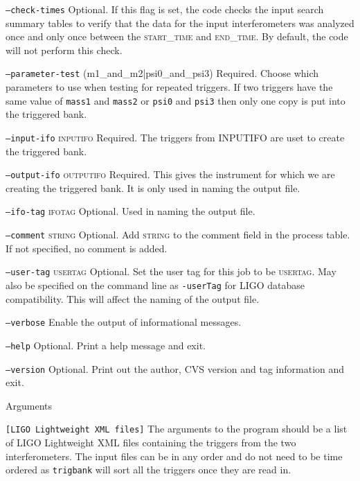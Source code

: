 \begin{entry}
\begin{entry}
\item[\texttt{--check-times}] Optional.  If this flag is set, the code checks
the input search summary tables to verify that the data for the input
interferometers was analyzed once and only once between the
\textsc{start\_time} and \textsc{end\_time}.  By default, the code will not
perform this check.

\item[\texttt{--parameter-test} (m1\_and\_m2|psi0\_and\_psi3)] Required. Choose
which parameters to use when testing for repeated triggers.  If two triggers
have the same value of \texttt{mass1} and \texttt{mass2} or \texttt{psi0} and
\texttt{psi3} then only one copy is put into the triggered bank.

\item[\texttt{--input-ifo} \textsc{inputifo}] Required. The triggers from
\textsc{INPUTIFO} are uset to create the triggered bank.

\item[\texttt{--output-ifo} \textsc{outputifo}] Required. This gives the
instrument for which we are creating the triggered bank.  It is only used in
naming the output file.

\item[\texttt{--ifo-tag} \textsc{ifotag}] Optional.  Used in naming the output
file.

\item[\texttt{--comment} \textsc{string}] Optional. Add \textsc{string}
to the comment field in the process table. If not specified, no comment
is added. 

\item[\texttt{--user-tag} \textsc{usertag}] Optional. Set the user tag for
this job to be \textsc{usertag}. May also be specified on the command line as
\texttt{-userTag} for LIGO database compatibility.  This will affect the
naming of the output file.

\item[\texttt{--verbose}] Enable the output of informational messages.

\item[\texttt{--help}] Optional.  Print a help message and exit.

\item[\texttt{--version}] Optional.  Print out the author, CVS version and
tag information and exit.

\end{entry}

\item[Arguments]\leavevmode
\begin{entry}
\item[\texttt{[LIGO Lightweight XML files]}] The arguments to the program
should be a list of LIGO Lightweight XML files containing the triggers from the
two interferometers. The input files can be in any order and do not need to be
time ordered as \texttt{trigbank} will sort all the triggers once they are read
in. 
\end{entry}


\end{entry}
